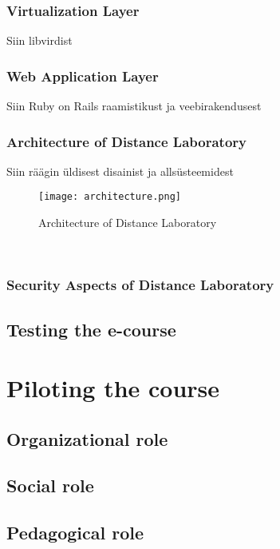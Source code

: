 \subsubsection{Virtualization Layer}
Siin libvirdist
\subsubsection{Web Application Layer}
Siin Ruby on Rails raamistikust ja veebirakendusest
\subsubsection{Architecture of Distance Laboratory}
Siin räägin üldisest disainist ja allsüsteemidest
\
\begin{figure}[ht]
\centering
\texttt{[image: architecture.png]}
\caption{Architecture of Distance Laboratory}
\label{fig:Architecture of Distance Laboratory}
\end{figure}
\

\subsubsection{Security Aspects of Distance Laboratory}

\subsection{Testing the e-course}
\section{Piloting the course}
\subsection{Organizational role}
\subsection{Social role}
\subsection{Pedagogical role}